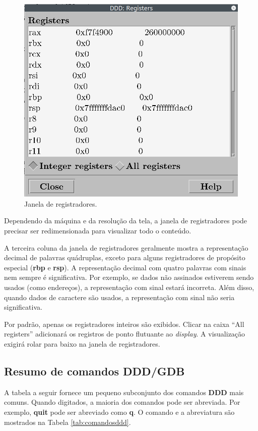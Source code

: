 \begin{figure}[h]
	\begin{center}
		\includegraphics[width=0.5\linewidth]{imagens/ddd05}
	\end{center}
	\caption{Janela de registradores.}
\end{figure}

Dependendo da máquina e da resolução da tela, a janela de registradores pode precisar ser redimensionada para visualizar todo o conteúdo.

A terceira coluna da janela de registradores geralmente mostra a representação decimal de palavras quádruplas, exceto para alguns registradores de propósito especial (\textbf{rbp} e \textbf{rsp}). A representação decimal com quatro palavras com sinais nem sempre é significativa. Por exemplo, se dados não assinados estiverem sendo usados (como endereços), a representação com sinal estará incorreta. Além disso, quando dados de caractere são usados, a representação com sinal não seria significativa.

Por padrão, apenas os registradores inteiros são exibidos. Clicar na caixa ``All registers'' adicionará os registros de ponto flutuante ao \textit{display}. A visualização exigirá rolar para baixo na janela de registradores.

\subsection{Resumo de comandos DDD/GDB}
A tabela a seguir fornece um pequeno subconjunto dos comandos \textbf{DDD} mais comuns. Quando digitados, a maioria dos comandos pode ser abreviada. Por exemplo, \textbf{quit} pode ser abreviado como \textbf{q}. O comando e a abreviatura são mostrados na Tabela \ref{tab:comandosddd}.

